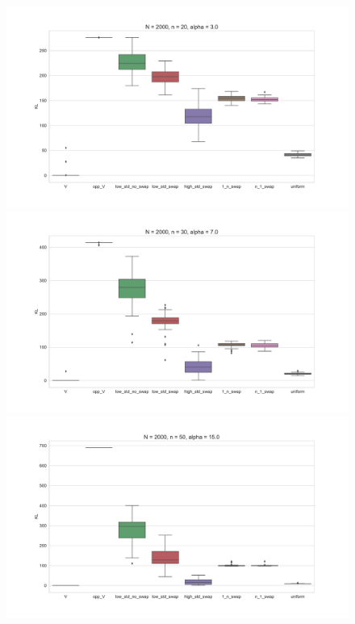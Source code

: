 \documentclass[11pt, oneside]{article}   	%
\begin{document}
\begin{figure}[h!]
\begin{minipage}[t]{.23\textwidth}
		\end{minipage}
		\hfill
		\begin{minipage}[t]{.23\textwidth}
			\centering
			\includegraphics[width=\textwidth]{figures/theorem2_2/N2000n20alpha3.pdf}
			
		\end{minipage} 
		\begin{minipage}[t]{.23\textwidth}
			\centering
			\includegraphics[width=\textwidth]{figures/theorem2_2/N2000n30alpha7.pdf}
			
		\end{minipage}
		\hfill
		\begin{minipage}[t]{.23\textwidth}
			\centering
			\includegraphics[width=\textwidth]{figures/theorem2_2/N2000n50alpha15.pdf}
			

\end{minipage}
\end{figure}
\end{document}
